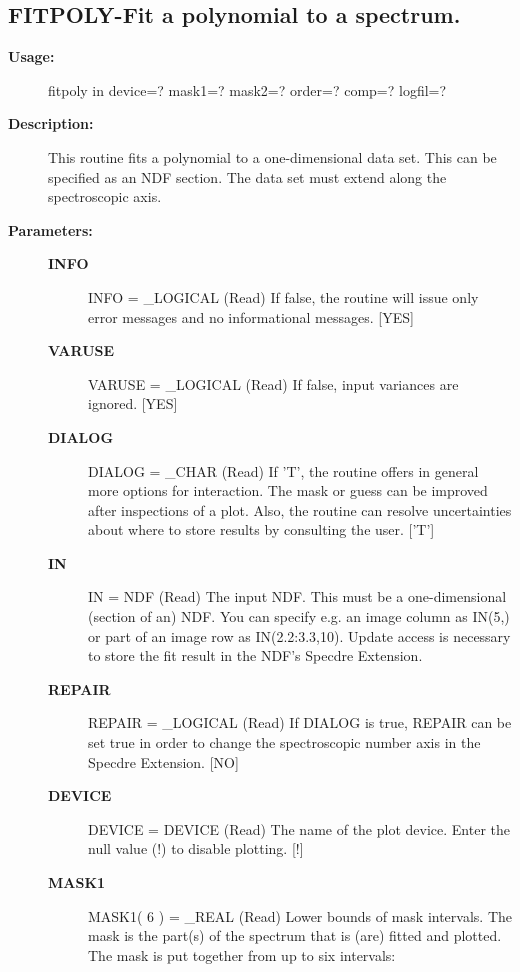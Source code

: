 \subsection{FITPOLY-\label{FITPOLY}Fit a polynomial to a spectrum.}
\begin{description}

\item [{\bf Usage:}]

   fitpoly in device=? mask1=? mask2=? order=? comp=? logfil=?


\item [{\bf Description:}]

   This routine fits a polynomial to a one-dimensional data set. This
   can be specified as an NDF section. The data set must extend along
   the spectroscopic axis.


\item [{\bf Parameters:}]
\begin{description}
\item [{\bf INFO}]
INFO = _LOGICAL (Read)
   If false, the routine will issue only error messages and no
   informational messages. [YES]
\item [{\bf VARUSE}]
VARUSE = _LOGICAL (Read)
   If false, input variances are ignored. [YES]
\item [{\bf DIALOG}]
DIALOG = _CHAR (Read)
   If 'T', the routine offers in general more options for
   interaction. The mask or guess can be improved after
   inspections of a plot. Also, the routine can resolve
   uncertainties about where to store results by consulting the
   user. ['T']
\item [{\bf IN}]
IN = NDF (Read)
   The input NDF. This must be a one-dimensional (section of an)
   NDF. You can specify e.g. an image column as IN(5,) or part of
   an image row as IN(2.2:3.3,10). Update access is necessary to
   store the fit result in the NDF's Specdre Extension.
\item [{\bf REPAIR}]
REPAIR = _LOGICAL (Read)
   If DIALOG is true, REPAIR can be set true in order to change
   the spectroscopic number axis in the Specdre Extension. [NO]
\item [{\bf DEVICE}]
DEVICE = DEVICE (Read)
   The name of the plot device. Enter the null value (!) to
   disable plotting. [!]
\item [{\bf MASK1}]
MASK1( 6 ) = _REAL (Read)
   Lower bounds of mask intervals. The mask is the part(s) of the
   spectrum that is (are) fitted and plotted. The mask is put
   together from up to six intervals:


\end{description}
\end{description}
